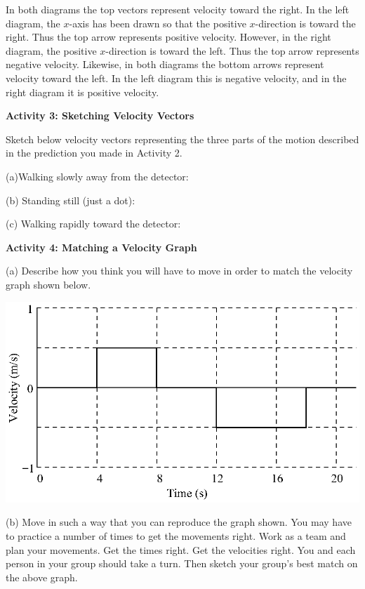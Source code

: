 In both diagrams the top vectors represent velocity toward the right. In the
left diagram, the $x$-axis has been drawn so that the positive $x$-direction is
toward the right. Thus the top arrow represents positive velocity. However,
in the right diagram, the positive $x$-direction is toward the left. Thus the
top arrow represents negative velocity. Likewise, in both diagrams the bottom
arrows represent velocity toward the left. In the left diagram this is negative
velocity, and in the right diagram it is positive velocity.

\textbf{Activity 3: Sketching Velocity Vectors} 

Sketch below velocity vectors representing the three parts of the motion described
in the prediction you made in Activity 2.

(a)Walking slowly away from the detector:
\answerspace{8mm}

(b) Standing still (just a dot):
\answerspace{8mm}

(c) Walking rapidly toward the detector:
\answerspace{8mm}

\pagebreak[2]
\textbf{Activity 4: Matching a Velocity Graph} 

(a) Describe how you think you will have to move in order to match the velocity
graph shown below.

\vspace{0.3cm}
{\par\centering \includegraphics{velocity/velocity_fig7.eps} \par}
\vspace{0.3cm}

\answerspace{25mm}
(b) Move in such a way that you can reproduce the graph shown. You may have
to practice a number of times to get the movements right. Work as a team and
plan your movements. Get the times right. Get the velocities right. You and
each person in your group should take a turn. Then sketch your group's best
match on the above graph.

